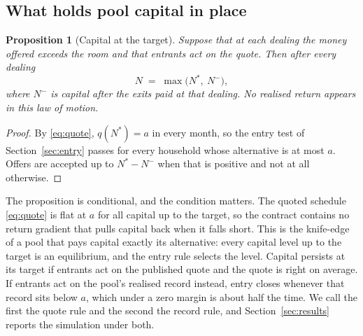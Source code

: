 \documentclass[10pt,a4paper]{article}
\newtheorem{proposition}{Proposition}
\theoremstyle{remark}
\begin{document}
\subsection{What holds pool capital in place}
\begin{proposition}[Capital at the target]
\label{prop:capital}
Suppose that at each dealing the money offered exceeds the room and that
entrants act on the quote. Then after every dealing
\begin{equation}
N \;=\; \max\bigl(N^{*},\ N^{-}\bigr),
\label{eq:capital}
\end{equation}
where \(N^{-}\) is capital after the exits paid at that dealing. No realised
return appears in this law of motion.
\end{proposition}
\begin{proof}
By \eqref{eq:quote}, \(q(N^{*})=a\) in every month, so the entry test of
Section~\ref{sec:entry} passes for every household whose alternative is at
most \(a\). Offers are accepted up to \(N^{*}-N^{-}\) when that is positive
and not at all otherwise.
\end{proof}
The proposition is conditional, and the condition matters. The
quoted schedule \eqref{eq:quote} is flat at \(a\) for all capital up to the
target, so the contract contains no return gradient that pulls capital back
when it falls short. This is the knife-edge of a pool that pays capital
exactly its alternative: every capital level up to the target is an
equilibrium, and the entry rule selects the level. Capital persists at
its target if entrants act on the published quote and the quote is right on
average. If entrants act on the pool's realised record instead, entry closes
whenever that record sits below \(a\), which under a zero margin is about
half the time. We call the first the quote rule and the second the record
rule, and Section~\ref{sec:results} reports the simulation under both.
\end{document}
